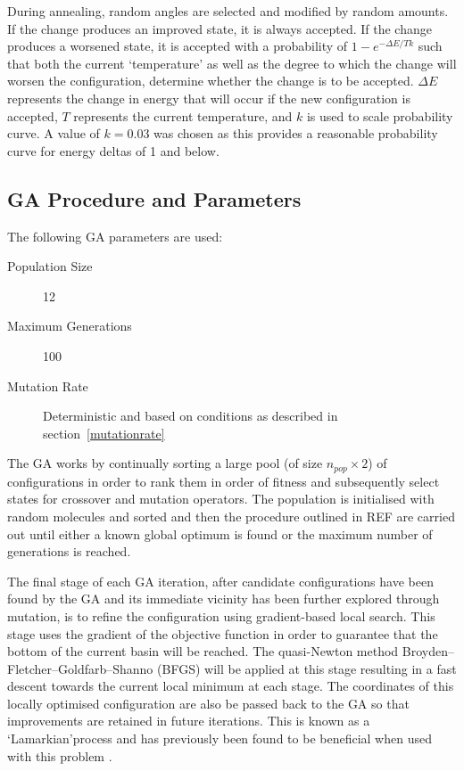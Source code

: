 \documentclass{article}
\begin{document}
During annealing, random angles are selected and modified by random amounts. If
the change produces an improved state, it is always accepted. If the change
produces a worsened state, it is accepted with a probability of $1 - e^{-\Delta
E / Tk}$ such that both the current `temperature' as well as the degree to which
the change will worsen the configuration, determine whether the change is to be
accepted. $\Delta E$ represents the change in energy that will occur if the new
configuration is accepted, $T$ represents the current temperature, and $k$ is
used to scale probability curve. A value of $k=0.03$ was chosen as this provides
a reasonable probability curve for energy deltas of 1 and below.

\subsection{GA Procedure and Parameters}

The following GA parameters are used:
\begin{description}
	\item[Population Size] 12
	\item[Maximum Generations] 100
	\item[Mutation Rate] Deterministic and based on conditions as described in
	section~\ref{mutationrate}
\end{description}
The GA works by continually sorting a large pool (of size $n_{pop} \times 2$) of
configurations in order to rank them in order of fitness and subsequently select
states for crossover and mutation operators. The population is initialised with
random molecules and sorted and then the procedure outlined in REF are carried
out until either a known global optimum is found or the maximum number of
generations is reached.


The final stage of each GA iteration, after candidate configurations have been
found by the GA and its immediate vicinity has been further explored through
mutation, is to refine the configuration using gradient-based local search. This
stage uses the gradient of the objective function in order to guarantee that the
bottom of the current basin will be reached. The quasi-Newton method
Broyden–Fletcher–Goldfarb–Shanno (BFGS) will be applied at this stage resulting
in a fast descent towards the current local minimum at each stage. The
coordinates of this locally optimised configuration are also be passed back to
the GA so that improvements are retained in future iterations. This is known as
a `Lamarkian'process and has previously been found to be beneficial when used
with this problem \cite{doi:10.1002/qua.560440214}.
\end{document}
